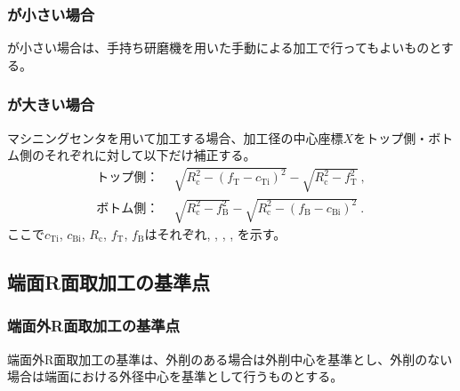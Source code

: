 \subsubsection{\EndFaceInChamferLength が小さい場合}
\EndFaceInChamferLength が小さい場合は、手持ち研磨機を用いた手動による加工で行ってもよいものとする。

\subsubsection{\EndFaceInChamferLength が大きい場合}
マシニングセンタを用いて加工する場合、加工径の中心座標$X$をトップ側・ボトム側のそれぞれに対して以下だけ補正する。
\begin{align*}
  \text{トップ側：}&~~
  \sqrt{R_\mathrm c^2-\left(f_\mathrm T-c_\mathrm{Ti}\right)^2}-\sqrt{R_\mathrm c^2-f_\mathrm T^2}\ ,\\
  \text{ボトム側：}&~~
  \sqrt{R_\mathrm c^2-f_\mathrm B^2}-\sqrt{R_\mathrm c^2-\left(f_\mathrm B-c_\mathrm{Bi}\right)^2}\ .
\end{align*}
ここで$c_\mathrm{Ti}$, $c_\mathrm{Bi}$, $R_\mathrm c$, $f_\mathrm T$, $f_\mathrm B$はそれぞれ\TopEndFaceInChamferLength, \BottomEndFaceInChamferLength, \CenterCurvatureRadius, \TopAlocationLength, \BottomAlocationLength を示す。



\clearpage


\subsection{端面R面取加工の基準点}

\subsubsection{端面外R面取加工の基準点}
端面外R面取加工の基準は、外削のある場合は外削中心を基準とし、外削のない場合は端面における外径中心を基準として行うものとする。

